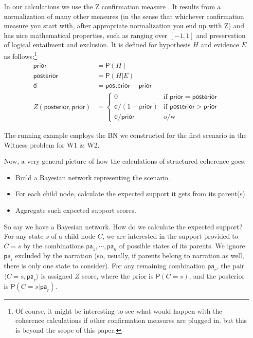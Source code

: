 \documentclass[10pt,]{scrartcl}
\newcommand{\ra}{\rangle}
\newcommand{\la}{\langle}
\newcommand{\pr}{\mathsf{P}}
\newcommand{\s}[1]{\mbox{\textsf{#1}}}
\begin{document}
In our calculations we use the \s{Z} confirmation measure \citep[see][for a detailed study and defense]{crupi2007BayesianMeasuresEvidential}. It results from a
normalization of many other measures (in the sense that whichever
confirmation measure you start with, after appropriate normalization you
end up with \s{Z}) and has nice mathematical properties, such as ranging
over \([-1,1]\) and preservation of logical entailment and exclusion. It
is defined for hypothesis \(H\) and evidence \(E\) as follows:\footnote{Of course, it might be interesting to see what would happen
with the coherence calculations if other confirmation measures are
plugged in, but this is beyond the scope of this paper.}
\begin{align*}
   \mathsf{prior} & = \pr(H) \\
   \mathsf{posterior} & = \pr(H \vert E)\\
   \mathsf{d} & = \mathsf{posterior} - \mathsf{prior} \\
       Z(\mathsf{posterior,prior}) & =  \begin{cases}
       0 & \text{if } \mathsf{prior} = \mathsf{posterior}\\
       \mathsf{d}/(1-\mathsf{prior}) & \text{if } \mathsf{posterior} > \mathsf{prior} \\
         \mathsf{d}/\mathsf{prior} & \text{o/w} 
       \end{cases}
   \end{align*}



 The running example employs the BN we
constructed for the first scenario in the \textsf{Witness} problem for \textsf{W1} \& \textsf{W2}.











Now, a very general picture of how the calculations of structured coherence  goes:

\begin{itemize}
    \item Build a Bayesian network representing the scenario.
    \item For each child node, calculate the expected support it gets from its parent(s). 
    \item Aggregate such expected support scores.
\end{itemize}


So say we have a Bayesian network. How do we calculate the expected support? For any state \(s\) of
a child node \(C\), we are interested in the
support provided to \(C=s\) by the combinations
\(\mathsf{pa}_1, \cdots, \mathsf{pa}_n\) of possible states of its
parents. We ignore \(\mathsf{pa}_i\) excluded by the narration (so, usually, if parents belong to narration as well, there is only one state to consider). For any
remaining combination \(\mathsf{pa}_r\), the pair
\(\la C=s, \mathsf{pa}_r\ra\) is assigned  $Z$ score, where the prior is $\pr(C=s)$, and the posterior is $\pr(C=s \vert \mathsf{pa}_r)$.
\end{document}
